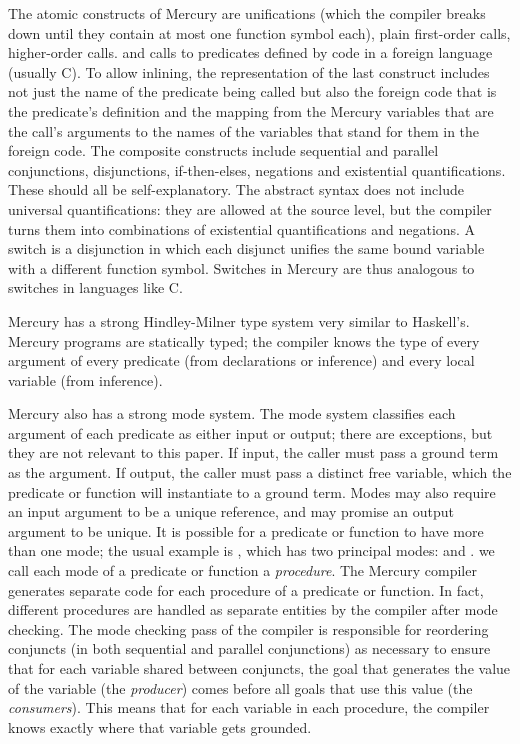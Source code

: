 \noindent
The atomic constructs of Mercury are unifications
(which the compiler breaks down until they contain
at most one function symbol each),
plain first-order calls,
higher-order calls.
and calls to predicates defined by code in a foreign language (usually C).
To allow inlining, the representation of the last construct includes
not just the name of the predicate being called
but also the foreign code that is the predicate's definition
and the mapping from the Mercury variables that are the call's arguments
to the names of the variables that stand for them in the foreign code.
The composite constructs include
sequential and parallel conjunctions,
disjunctions, if-then-elses, negations and existential quantifications.
These should all be self-explanatory.
The abstract syntax does not include universal quantifications:
they are allowed at the source level,
but the compiler turns them into
combinations of existential quantifications and negations.
A switch is a disjunction in which
each disjunct unifies the same bound variable
with a different function symbol.
Switches in Mercury are thus analogous to switches in languages like C.

Mercury has a strong Hindley-Milner type system very similar to Haskell's.
Mercury programs are statically typed;
the compiler knows the type of every argument of every predicate
(from declarations or inference) and every local variable (from inference).

Mercury also has a strong mode system.
The mode system classifies each argument of each predicate
as either input or output;
there are exceptions, but they are not relevant to this paper.
If input, the caller must pass a ground term as the argument.
If output, the caller must pass a distinct free variable,
which the predicate or function will instantiate to a ground term.
Modes may also require an input argument to be a unique reference,
and may promise an output argument to be unique.
It is possible for a predicate or function to have more than one mode;
the usual example is , which has two principal modes:
 and .
we call each mode of a predicate or function a \emph{procedure}.
The Mercury compiler generates separate code
for each procedure of a predicate or function.
In fact, different procedures are handled as separate entities by
the compiler after mode checking.
The mode checking pass of the compiler is responsible for
reordering conjuncts (in both sequential and parallel conjunctions)
as necessary to ensure that for each variable shared between conjuncts,
the goal that generates the value of the variable (the \emph{producer})
comes before all goals that use this value (the \emph{consumers}).
This means that for each variable in each procedure,
the compiler knows exactly where that variable gets grounded.

